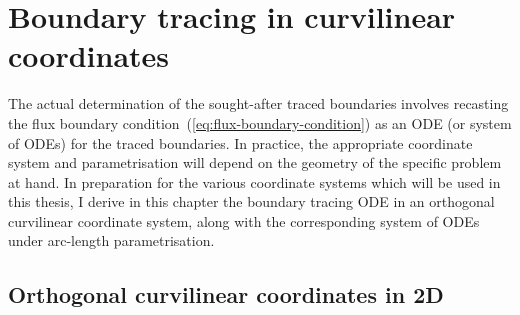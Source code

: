 \chapter{Boundary tracing in curvilinear coordinates}

The actual determination of the sought-after traced boundaries involves
recasting the flux boundary condition~(\ref{eq:flux-boundary-condition})
as an ODE (or system of ODEs) for the traced boundaries.
In practice, the appropriate coordinate system and parametrisation
will depend on the geometry of the specific problem at hand.
In preparation for the various coordinate systems
which will be used in this thesis,
I derive in this chapter the boundary tracing ODE
in an orthogonal curvilinear coordinate system,
along with the corresponding system of ODEs
under arc-length parametrisation.

\section{Orthogonal curvilinear coordinates in 2D}

